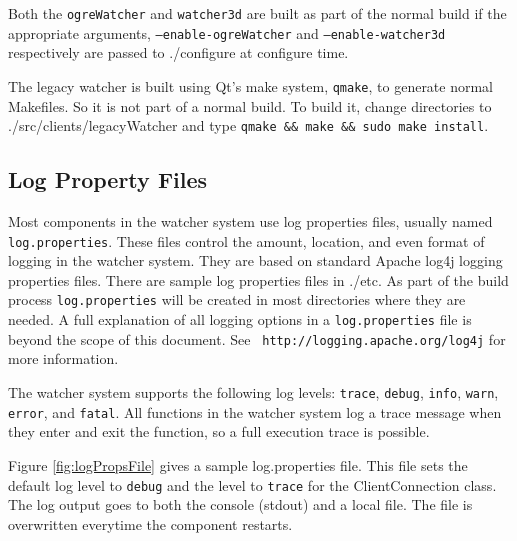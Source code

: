 \documentclass{article}
\begin{document}
Both the {\tt ogreWatcher} and {\tt watcher3d} are built as part of the normal build if the appropriate arguments, {\tt --enable-ogreWatcher} and {\tt --enable-watcher3d} respectively are passed to 
.\slash configure at configure time. 

The legacy watcher is built using Qt's make system, {\tt qmake}, to generate normal Makefiles. So it is not part of a normal build. To build it, change
directories to .\slash src\slash clients\slash legacyWatcher and type {\tt qmake \&\& make \&\& sudo make install}. 

\subsection{Log Property Files}
Most components in the watcher system use log properties files, usually named {\tt log.properties}. These files control the amount, location, and even format of logging in the 
watcher system. They are based on standard Apache log4j logging properties files. There are sample log properties files in .\slash etc. As part of the build process {\tt log.properties} 
will be created in most directories where they are needed. A full explanation of all logging options in a {\tt log.properties} file is beyond the scope of this document. See {\tt
http://logging.apache.org/log4j} for more information. 

The watcher system supports the following log levels: {\tt trace}, {\tt debug}, {\tt info}, {\tt warn}, {\tt error}, and {\tt fatal}. All functions in the watcher system
log a trace message when they enter and exit the function, so a full execution trace is possible. 

Figure \ref{fig:logPropsFile} gives a sample log.properties file. This file sets the default log level to {\tt debug} and the level to {\tt trace} for the ClientConnection class. The 
log output goes to both the console (stdout) and a local file. The file is overwritten everytime the component restarts. 
\end{document}
